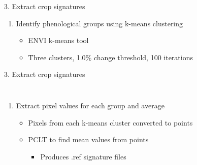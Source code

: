 \documentclass[  compress,xcolor={usenames,dvipsnames}]{beamer}
\begin{document}
\begin{frame}{3. Extract crop signatures}
\begin{enumerate}
  \item[3.3] Identify phenological groups using k-means clustering
  \begin{itemize}
    \item ENVI k-means tool
    \item Three clusters, 1.0\% change threshold, 100 iterations
  \end{itemize}
\end{enumerate}
\end{frame}

\begin{frame}{3. Extract crop signatures}
\begin{columns}
  \begin{minipage}{1.2\textwidth}
  \small\begin{enumerate}
    \item[3.3] Extract pixel values for each group and average
    \begin{itemize}
      \item Pixels from each k-means cluster converted to points
      \item PCLT to find mean values from points
      \begin{itemize}
        \item Produces .ref signature files
      \end{itemize}
    \end{itemize}
  \end{enumerate}
  \end{minipage}
  \begin{figure}
    \raggedleft
    \resizebox{\textwidth}{!}{}
  \end{figure}
\end{columns}
\end{frame}
\end{document}
